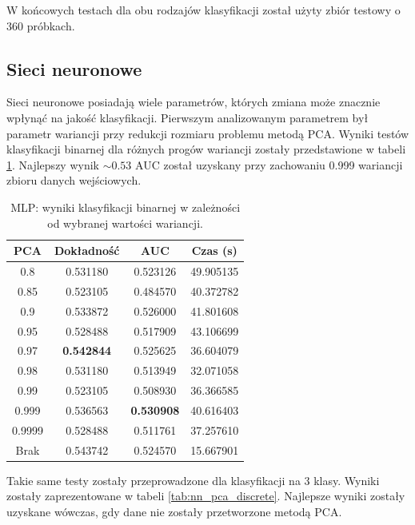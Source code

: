 \documentclass[a4paper, twoside, 11pt, openright]{article}
\begin{document}
W końcowych testach dla obu rodzajów klasyfikacji został użyty zbiór testowy o 360 próbkach.

\subsection{Sieci neuronowe}

Sieci neuronowe posiadają wiele parametrów, których zmiana może znacznie wpłynąć na jakość klasyfikacji. Pierwszym analizowanym parametrem był parametr wariancji przy redukcji rozmiaru problemu metodą PCA. Wyniki testów klasyfikacji binarnej dla różnych progów wariancji zostały przedstawione w tabeli \ref{tab:nn_pca_binary}. Najlepszy wynik $\sim 0.53$ AUC został uzyskany przy zachowaniu 0.999 wariancji zbioru danych wejściowych.

\begin{table}[H]
    \centering
    \begin{tabular}{|c|c|c|c|}
    \hline
        \textbf{PCA} & \textbf{Dokładność} &  \textbf{AUC} &  \textbf{Czas (s)} \\ \hline
0.8                &  0.531180 &  0.523126 &   49.905135 \\ \hline
0.85               &  0.523105 &  0.484570 &   40.372782 \\ \hline
0.9                &  0.533872 &  0.526000 &   41.801608 \\ \hline
0.95               &  0.528488 &  0.517909 &   43.106699 \\ \hline
0.97               &  \textbf{0.542844} &  0.525625 &   36.604079 \\ \hline
0.98               &  0.531180 &  0.513949 &   32.071058 \\ \hline
0.99               &  0.523105 &  0.508930 &   36.366585 \\ \hline
0.999              &  0.536563 &  \textbf{0.530908} &   40.616403 \\ \hline
0.9999             &  0.528488 &  0.511761 &   37.257610 \\ \hline
Brak               &  0.543742 &  0.524570 &   15.667901 \\ \hline

    \end{tabular}
    \caption{MLP: wyniki klasyfikacji binarnej w zależności od wybranej wartości wariancji.}
    \label{tab:nn_pca_binary}
\end{table}

Takie same testy zostały przeprowadzone dla klasyfikacji na 3 klasy. Wyniki zostały zaprezentowane w tabeli \ref{tab:nn_pca_discrete}. Najlepsze wyniki zostały uzyskane wówczas, gdy dane nie zostały przetworzone metodą PCA.
\end{document}

